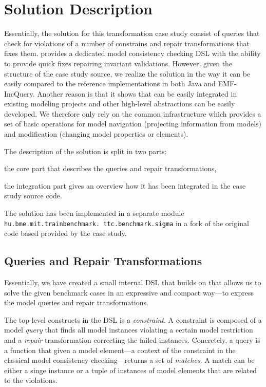 

\section{Solution Description}
\label{sec:SolutionDescription}

Essentially, the solution for this transformation case study consist of queries that check for violations of a number of constrains and repair transformations that fixes them.
\SIGMA provides a dedicated model consistency checking DSL with the ability to provide quick fixes repairing invariant validations.
However, given the structure of the case study source, we realize the solution in the way it can be easily compared to the reference implementations in both Java and EMF-IncQuery.
Another reason is that it shows that \SIGMA can be easily integrated in existing modeling projects and other high-level abstractions can be easily developed.
We therefore only rely on the \SIGMA common infrastructure which provides a set of basic operations for model navigation (\Ie projecting information from models) and modification (\Ie changing model properties or elements).

The description of the solution is split in two parts:
\begin{inparaenum}[(1)]
  \item the core part that describes the queries and repair transformations,
  \item the integration part gives an overview how it has been integrated in the case study source code.
\end{inparaenum}

The solution has been implemented in a separate module \texttt{hu.bme.mit.trainbenchmark. ttc.benchmark.sigma} in a fork of the original code based provided by the case study.

\subsection{Queries and Repair Transformations}

Essentially, we have created a small internal DSL that builds on \SIGMA that allows us to solve the given benchmark cases in an expressive and compact way---\Ie to express the model queries and repair transformations.

The top-level constructs in the DSL is a \emph{constraint}.
A constraint is composed of a model \emph{query} that finds all model instances violating a certain model restriction and a \emph{repair} transformation correcting the failed instances.
Concretely, a query is a function that given a model element---\Ie a context of the constraint in the classical model consistency checking---returns a set of \emph{matches}.
A match can be either a singe instance or a tuple of instances of model elements that are related to the violations.


